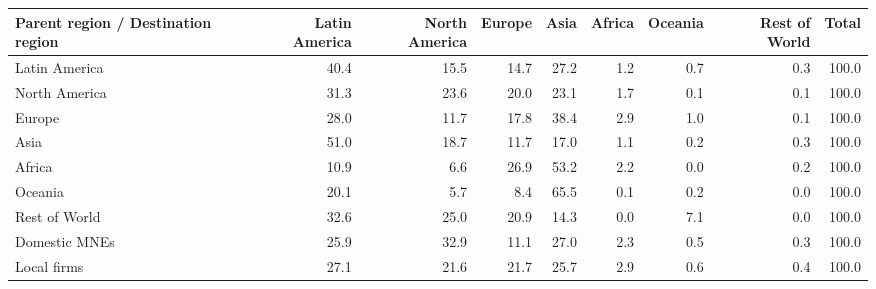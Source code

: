 \begin{tabular}{lrrrrrrrr}
\toprule
Parent region / Destination region & Latin America & North America & Europe & Asia & Africa & Oceania & Rest of World & Total \\
\midrule
Latin America & 40.4 & 15.5 & 14.7 & 27.2 & 1.2 & 0.7 & 0.3 & 100.0 \\
North America & 31.3 & 23.6 & 20.0 & 23.1 & 1.7 & 0.1 & 0.1 & 100.0 \\
Europe & 28.0 & 11.7 & 17.8 & 38.4 & 2.9 & 1.0 & 0.1 & 100.0 \\
Asia & 51.0 & 18.7 & 11.7 & 17.0 & 1.1 & 0.2 & 0.3 & 100.0 \\
Africa & 10.9 & 6.6 & 26.9 & 53.2 & 2.2 & 0.0 & 0.2 & 100.0 \\
Oceania & 20.1 & 5.7 & 8.4 & 65.5 & 0.1 & 0.2 & 0.0 & 100.0 \\
Rest of World & 32.6 & 25.0 & 20.9 & 14.3 & 0.0 & 7.1 & 0.0 & 100.0 \\
Domestic MNEs & 25.9 & 32.9 & 11.1 & 27.0 & 2.3 & 0.5 & 0.3 & 100.0 \\
Local firms & 27.1 & 21.6 & 21.7 & 25.7 & 2.9 & 0.6 & 0.4 & 100.0 \\
\bottomrule
\end{tabular}
